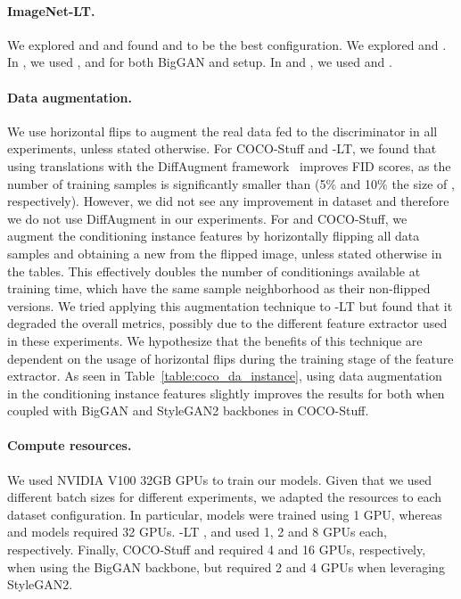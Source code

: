 \paragraph{ImageNet-LT.} We explored  and  and found  and  to be the best configuration. We explored  and . In , we used ,  and  for both BigGAN and \ours setup. In  and , we used   and .
  
  
\paragraph{Data augmentation.} We use horizontal flips to augment the real data fed to the discriminator in all experiments, unless stated otherwise. For COCO-Stuff and \ImNet-LT, we found that using translations with the DiffAugment framework~\cite{zhao2020differentiable} improves FID scores, as the number of training samples is significantly smaller than \ImNet (5\% and 10\% the size of \ImNet, respectively). However, we did not see any improvement in \ImNet dataset and therefore we do not use DiffAugment in our \ImNet experiments.
For \ImNet and COCO-Stuff, we augment the conditioning instance features  by horizontally flipping all data samples  and obtaining a new  from the flipped image, unless stated otherwise in the tables. This effectively doubles the number of conditionings available at training time, which have the same sample neighborhood  as their non-flipped versions. We tried applying this augmentation technique to \ImNet-LT but found that it degraded the overall metrics, possibly due to the different feature extractor used in these experiments. We hypothesize that the benefits of this technique are dependent on the usage of horizontal flips during the training stage of the feature extractor.
As seen in Table~\ref{table:coco_da_instance}, using data augmentation in the conditioning instance features slightly improves the results for \ours both when coupled with BigGAN and StyleGAN2 backbones in COCO-Stuff.

\paragraph{Compute resources.} We used NVIDIA V100 32GB GPUs to train our models. Given that we used different batch sizes for different experiments, we adapted the resources to each dataset configuration. In particular, \ImNet {} models were trained using 1 GPU, whereas \ImNet {} and  models required 32 GPUs. \ImNet-LT ,  and  used 1, 2 and 8 GPUs each, respectively. Finally, COCO-Stuff  and  required 4 and 16 GPUs, respectively, when using the BigGAN backbone, but required 2 and 4 GPUs when leveraging StyleGAN2.

